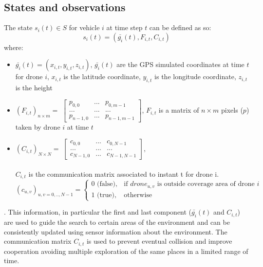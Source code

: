 \documentclass[LaM,binding=0.6cm]{sapthesis}
\begin{document}
\subsection*{States and observations}
The state $s_i(t) \in S$ for vehicle $i$ at time step $t$ can be defined as so:
$$ s_i(t) = (\bar{g_{i}}(t),F_{i,t},C_{i,t})$$
where:
\begin{itemize}
	\item $\bar{g_{i}}(t) = (x_{i,t},y_{i,t},z_{i,t})$, $\bar{g_{i}}(t)$ are the GPS simulated coordinates at time $t$ for drone $i$, $x_{i,t}$ is the latitude coordinate, $y_{i,t}$ is the longitude coordinate, $z_{i,t}$ is the height
	
	\item $(F_{i,t})_{n\times m} = $ 
	$\begin{bmatrix}
	p_{0,0} & ... & p_{0,m-1} \\ ... & ... & ... \\ p_{n-1,0} & ... & p_{n-1,m-1} 
	\end{bmatrix}
	$, $F_{i,t} $ is a matrix of $n\times m$ pixels ($p$) taken by drone $i$ at time $t$
	
	\item $(C_{i,t})_{N\times N} = $ 
	$\begin{bmatrix}
	c_{0,0} & ... & c_{0,N-1} \\ ... & ... & ... \\ c_{N-1,0} & ... & c_{N-1,N-1} 
	\end{bmatrix}
	$,\\ \\
	$C_{i,t} $ is the communication matrix associated to instant t for drone i.\\
	$(c_{u,v})_{u,v=0,..,N-1} = \begin{cases} 0 \mbox{ (false)}, & \mbox{if } drone_{u,v} \mbox{ is outside coverage area of drone }i \\ 1 \mbox{ (true)}, & \mbox{otherwise}
	\end{cases}$
\end{itemize}. This
information, in particular the first and last component ($\bar{g_i}(t)$ and $C_{i,t}$) are used to guide the search to certain areas of the
environment and can be consistently updated using sensor information about the environment. The communication matrix $C_{i,t}$ is used to prevent eventual collision and improve cooperation avoiding multiple exploration of the same places in a limited range of time.
\end{document}
